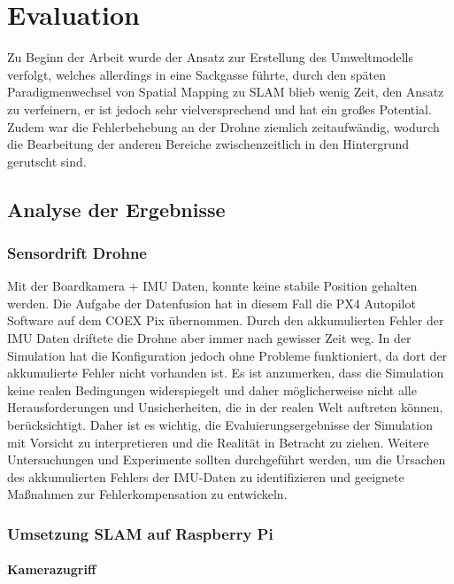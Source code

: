 \chapter{Evaluation}

Zu Beginn der Arbeit wurde der Ansatz zur Erstellung des Umweltmodells verfolgt, welches allerdings in eine Sackgasse führte, durch den späten Paradigmenwechsel von Spatial Mapping zu \ac{SLAM} blieb wenig Zeit, den Ansatz zu verfeinern, er ist jedoch sehr vielversprechend und hat ein großes Potential.
Zudem war die Fehlerbehebung an der Drohne ziemlich zeitaufwändig, wodurch die Bearbeitung der anderen Bereiche zwischenzeitlich in den Hintergrund gerutscht sind.

\section{Analyse der Ergebnisse}
\subsection{Sensordrift Drohne}

Mit der Boardkamera + \ac{IMU} Daten, konnte keine stabile Position gehalten werden. Die Aufgabe der Datenfusion hat in diesem Fall die PX4 Autopilot Software auf dem COEX Pix übernommen.
Durch den akkumulierten Fehler der \ac{IMU} Daten driftete die Drohne aber immer nach gewisser Zeit weg. In der Simulation hat die Konfiguration jedoch ohne Probleme funktioniert, da dort der akkumulierte Fehler nicht vorhanden ist.
Es ist anzumerken, dass die Simulation keine realen Bedingungen widerspiegelt und daher möglicherweise nicht alle Herausforderungen und Unsicherheiten, die in der realen Welt auftreten können, berücksichtigt. Daher ist es wichtig, die Evaluierungsergebnisse der Simulation mit Vorsicht zu interpretieren und die Realität in Betracht zu ziehen. Weitere Untersuchungen und Experimente sollten durchgeführt werden, um die Ursachen des akkumulierten Fehlers der \ac{IMU}-Daten zu identifizieren und geeignete Maßnahmen zur Fehlerkompensation zu entwickeln.


\subsection{Umsetzung SLAM auf Raspberry Pi}

\subsubsection{Kamerazugriff}

